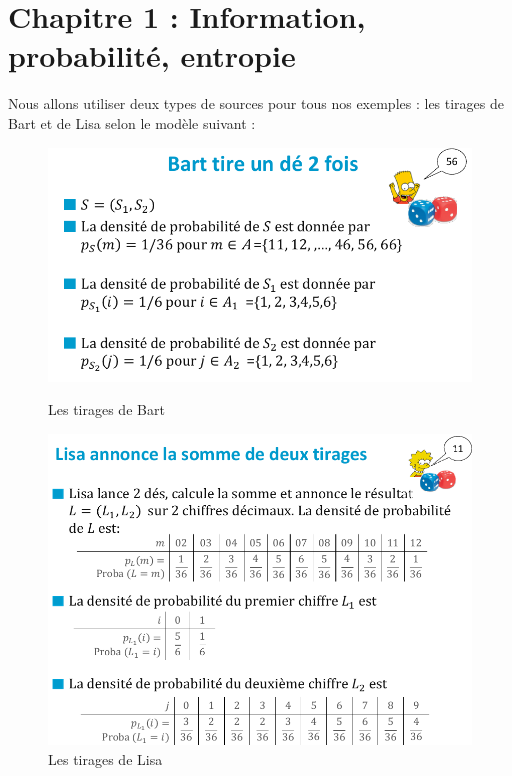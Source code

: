 \documentclass[11pt,a4paper]{article}
\renewcommand{\)}{\right)}
\renewcommand{\(}{\left(}
\begin{document}
\section[Information, probabilité, entropie]{Chapitre 1 : Information, probabilité, entropie}
\begin{exemple}
	Nous allons utiliser deux types de sources pour tous nos exemples : les tirages de Bart et de Lisa selon le modèle suivant :
\end{exemple}
\begin{figure}[!h]
	\centering
	\begin{minipage}[c]{.46\linewidth}
		\centering
		\includegraphics[scale=0.4]{images/bart}
		\caption{Les tirages de Bart}
		\label{bart}
	\end{minipage}
	\begin{minipage}[c]{.46\linewidth}
		\centering
		\includegraphics[scale=0.4]{images/lisa}
		\caption{Les tirages de Lisa}
		\label{lisa}
	\end{minipage}
\end{figure}
\end{document}
